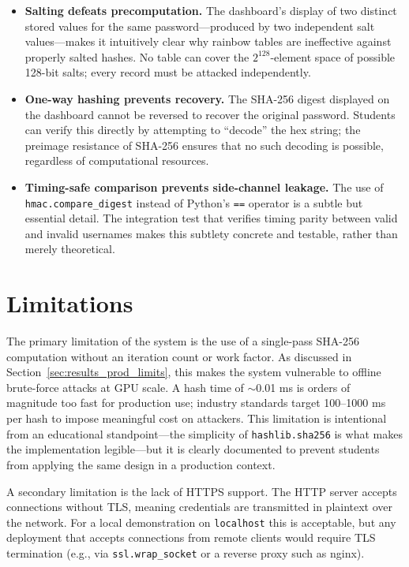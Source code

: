 \begin{itemize}
  \item \textbf{Salting defeats precomputation.} The dashboard's display of two distinct stored values for the same password---produced by two independent salt values---makes it intuitively clear why rainbow tables are ineffective against properly salted hashes. No table can cover the $2^{128}$-element space of possible 128-bit salts; every record must be attacked independently.

  \item \textbf{One-way hashing prevents recovery.} The SHA-256 digest displayed on the dashboard cannot be reversed to recover the original password. Students can verify this directly by attempting to ``decode'' the hex string; the preimage resistance of SHA-256 ensures that no such decoding is possible, regardless of computational resources.

  \item \textbf{Timing-safe comparison prevents side-channel leakage.} The use of \texttt{hmac.compare\_digest} instead of Python's \texttt{==} operator is a subtle but essential detail. The integration test that verifies timing parity between valid and invalid usernames makes this subtlety concrete and testable, rather than merely theoretical.
\end{itemize}

\section{Limitations}
\label{sec:conclusion_limitations}

The primary limitation of the system is the use of a single-pass SHA-256 computation without an iteration count or work factor. As discussed in Section~\ref{sec:results_prod_limits}, this makes the system vulnerable to offline brute-force attacks at GPU scale. A hash time of $\sim$0.01 ms is orders of magnitude too fast for production use; industry standards target 100--1000 ms per hash to impose meaningful cost on attackers. This limitation is intentional from an educational standpoint---the simplicity of \texttt{hashlib.sha256} is what makes the implementation legible---but it is clearly documented to prevent students from applying the same design in a production context.

A secondary limitation is the lack of HTTPS support. The HTTP server accepts connections without TLS, meaning credentials are transmitted in plaintext over the network. For a local demonstration on \texttt{localhost} this is acceptable, but any deployment that accepts connections from remote clients would require TLS termination (e.g., via \texttt{ssl.wrap\_socket} or a reverse proxy such as nginx).

